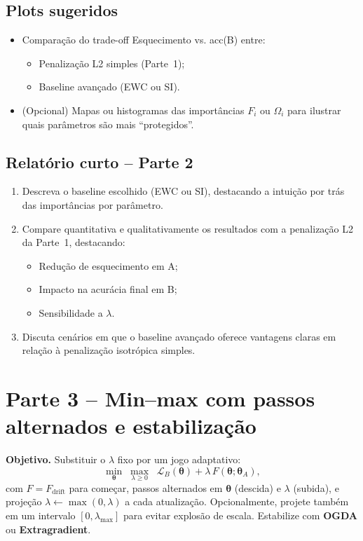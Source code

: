 \documentclass[9pt,a4paper]{extarticle}
\begin{document}
\subsection*{Plots sugeridos}
\begin{itemize}
    \item Comparação do trade-off Esquecimento vs. acc(B) entre:
    \begin{itemize}
        \item Penalização L2 simples (Parte~1);
        \item Baseline avançado (EWC ou SI).
    \end{itemize}
    \item (Opcional) Mapas ou histogramas das importâncias $F_i$ ou $\Omega_i$ para ilustrar quais parâmetros são mais ``protegidos''.
\end{itemize}

\subsection*{Relatório curto -- Parte 2}
\begin{enumerate}
    \item Descreva o baseline escolhido (EWC ou SI), destacando a intuição por trás das importâncias por parâmetro.
    \item Compare quantitativa e qualitativamente os resultados com a penalização L2 da Parte~1, destacando:
    \begin{itemize}
        \item Redução de esquecimento em A;
        \item Impacto na acurácia final em B;
        \item Sensibilidade a $\lambda$.
    \end{itemize}
    \item Discuta cenários em que o baseline avançado oferece vantagens claras em relação à penalização isotrópica simples.
\end{enumerate}

\section*{Parte 3 -- Min--max com passos alternados e estabilização}

\textbf{Objetivo.} Substituir o $\lambda$ fixo por um jogo adaptativo:
\[
\min_{\bm{\theta}}\;\max_{\lambda\ge 0}\;\; \mathcal{L}_B(\bm{\theta}) + \lambda\,F(\bm{\theta};\bm{\theta}_A),
\]
com $F = F_{\text{drift}}$ para começar, passos alternados em $\bm{\theta}$ (descida) e $\lambda$ (subida), e projeção $\lambda \leftarrow \max(0,\lambda)$ a cada atualização. Opcionalmente, projete também em um intervalo $[0,\lambda_{\max}]$ para evitar explosão de escala. Estabilize com \textbf{OGDA} ou \textbf{Extragradient}.
\end{document}
